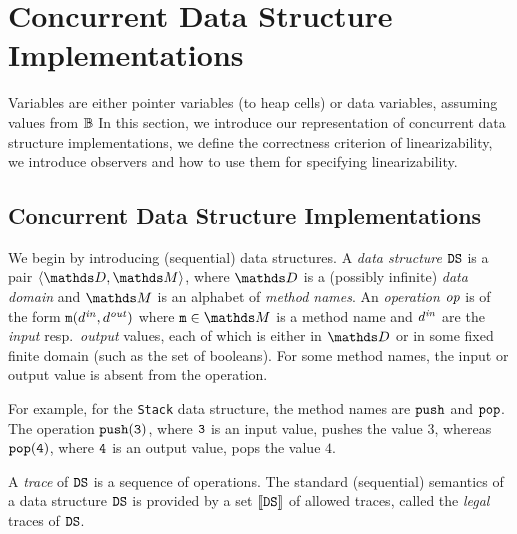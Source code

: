 \section{Concurrent Data Structure Implementations}
\label{programs:section}
Variables are either pointer variables (to heap cells) or data variables, assuming values from $\mathbb{B}$ 
In this section, we introduce our representation of
concurrent data structure implementations, we define the correctness criterion of
linearizability, we introduce observers and how to use them for specifying
linearizability.

\subsection{Concurrent Data Structure Implementations}

We begin by introducing (sequential) data structures.
A {\it data structure} ${\tt DS}$ is a pair
$\tuple{\ddomain,\malphabet}$,
where $\ddomain$ is a (possibly infinite) {\it data domain} and 
$\malphabet$ is an alphabet of {\em method names}.
%
%
An {\it operation} 
${\it op}$ is of the form
${\tt m}(d^{\it in},d^{\it out})$ where 
$\mname\in\malphabet$ is a method name and 
$d^{\it in}$ are the {\it input} resp.\ {\it output} values, each of which
is either in $\ddomain$ or in some fixed finite domain (such as the set of
booleans).
%
For some method names, the input or output value is absent from the operation.

For example, for the {\tt Stack} data structure, the method names
are $\tt push$ and $\tt pop$.
%
The operation ${\tt push(3)}$, where $\tt 3$ is an input value, pushes
the value $3$, whereas ${\tt pop(4)}$, where $\tt 4$ is an output value,
pops the value $4$.

A {\it trace} of ${\tt DS}$ is a sequence of operations.
The standard (sequential) semantics of a data structure ${\tt DS}$ is provided by
a set $\left\llbracket{{\tt DS}}\right\rrbracket$ of allowed traces,
called the {\it legal} traces of ${\tt DS}$.
%

%

